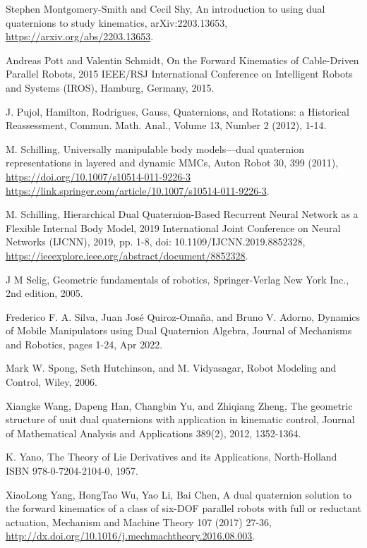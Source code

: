 \documentclass[reqno,12pt]{amsart}
\begin{document}
\begin{thebibliography}{99}
 Stephen Montgomery-Smith and Cecil Shy, An introduction to using dual quaternions to study kinematics, arXiv:2203.13653, \url{https://arxiv.org/abs/2203.13653}.

 Andreas Pott and Valentin Schmidt, On the Forward Kinematics of Cable-Driven Parallel Robots, 2015 IEEE/RSJ International Conference on Intelligent Robots and Systems (IROS), Hamburg, Germany, 2015.

 J. Pujol, Hamilton, Rodrigues, Gauss, Quaternions, and Rotations: a Historical Reassessment, Commun. Math. Anal., Volume 13, Number 2 (2012), 1-14.

  M. Schilling, Universally manipulable body models---dual quaternion representations in layered and dynamic MMCs, Auton Robot 30, 399 (2011), \url{https://doi.org/10.1007/s10514-011-9226-3 https://link.springer.com/article/10.1007/s10514-011-9226-3}.

 M. Schilling, Hierarchical Dual Quaternion-Based Recurrent Neural Network as a Flexible Internal Body Model, 2019 International Joint Conference on Neural Networks (IJCNN), 2019, pp. 1-8, doi: 10.1109/IJCNN.2019.8852328, \url{https://ieeexplore.ieee.org/abstract/document/8852328}.

 J M Selig, Geometric fundamentals of robotics, Springer-Verlag New York Inc., 2nd edition, 2005.

 Frederico F. A. Silva, Juan Jos\'e Quiroz-Oma\~na, and Bruno V. Adorno, Dynamics of Mobile Manipulators using Dual Quaternion Algebra, Journal of Mechanisms and Robotics, pages 1-24, Apr 2022.

 Mark W. Spong, Seth Hutchinson, and M. Vidyasagar, Robot Modeling and Control, Wiley, 2006.

 Xiangke Wang, Dapeng Han, Changbin Yu, and Zhiqiang Zheng, The geometric structure of unit dual quaternions with application in kinematic control, Journal of Mathematical Analysis and Applications 389(2), 2012, 1352-1364.

 K. Yano, The Theory of Lie Derivatives and its Applications, North-Holland ISBN 978-0-7204-2104-0, 1957.

 XiaoLong Yang, HongTao Wu, Yao Li, Bai Chen, A dual quaternion solution to the forward kinematics of a class of six-DOF parallel robots with full or reductant actuation, Mechanism and Machine Theory 107 (2017) 27-36, \url{http://dx.doi.org/10.1016/j.mechmachtheory.2016.08.003}.

\end{thebibliography}
\end{document}
